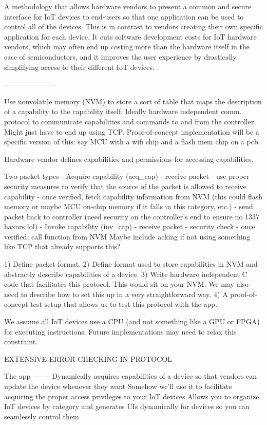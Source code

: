A methodology that allows hardware vendors to present a common and secure interface for IoT devices to end-users so that one application can be used to control all of the devices. This is in contrast to vendors creating their own specific application for each device. It cuts software development costs for IoT hardware vendors, which may often end up costing more than the hardware itself in the case of semiconductors, and it improves the user experience by drastically simplifying access to their different IoT devices.

----------------------

Use nonvolatile memory (NVM) to store a sort of table that maps the description of a capability to the capability itself.
Ideally hardware independent comm. protocol to communicate capabilities and commands to and from the controller. Might just have to end up using TCP.
Proof-of-concept implementation will be a specific version of this: say MCU with a wifi chip and a flash mem chip on a pcb.

Hardware vendor defines capabilities and permissions for accessing capabilities.

Two packet types
- Acquire capability (acq_cap)
	- receive packet
	- use proper security measures to verify that the source of the packet is allowed to receive capability
	- once verified, fetch capability information from NVM (this could flash memory or maybe MCU on-chip memory if it falls in this category, etc.)
	- send packet back to controller (need security on the controller's end to ensure no 1337 haxors lol)
- Invoke capability (inv_cap)
	- receive packet
	- security check
	- once verified, call function from NVM
Maybe include acking if not using something like TCP that already supports this?

1) Define packet format.
2) Define format used to store capabilities in NVM and abstractly describe capabilities of a device.
3) Write hardware independent C code that facilitates this protocol. This would sit on your NVM. We may also need to describe how to set this up in a very straightforward way.
4) A proof-of-concept test setup that allows us to test this protocol with the app.

We assume all IoT devices use a CPU (and not something like a GPU or FPGA) for executing instructions. Future implementations may need to relax this constraint.

EXTENSIVE ERROR CHECKING IN PROTOCOL

The app
-------
Dynamically acquires capabilities of a device so that vendors can update the device whenever they want
Somehow we'll use it to facilitate acquiring the proper access privileges to your IoT devices
Allows you to organize IoT devices by category and generates UIs dynamically for devices so you can seamlessly control them
